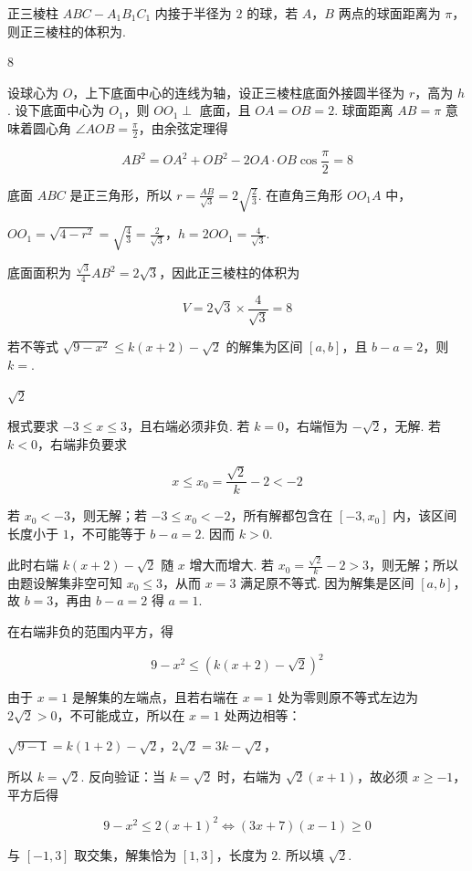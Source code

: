 \begin{problem}
正三棱柱 \(ABC - A_{1}B_{1}C_{1}\) 内接于半径为 \(2\) 的球，若 \(A\)，\(B\) 两点的球面距离为 \(\pi\)，则正三棱柱的体积为\fillinblank{}.
\end{problem}

\begin{answer}
\(8\)
\end{answer}

\begin{solution}
设球心为 \(O\)，上下底面中心的连线为轴，设正三棱柱底面外接圆半径为 \(r\)，高为 \(h\). 设下底面中心为 \(O_1\)，则 \(OO_1\perp\) 底面，且 \(OA=OB=2\). 球面距离 \(AB=\pi\) 意味着圆心角 \(\angle AOB=\frac\pi2\)，由余弦定理得

\[
AB^2=OA^2+OB^2-2OA\cdot OB\cos\frac\pi2=8
\]

底面 \(ABC\) 是正三角形，所以 \(r=\frac{AB}{\sqrt3}=2\sqrt{\frac23}\). 在直角三角形 \(OO_1A\) 中，

\(OO_1=\sqrt{4-r^2}=\sqrt{\frac43}=\frac2{\sqrt3}\)，\(h=2OO_1=\frac4{\sqrt3}\).

底面面积为 \(\frac{\sqrt3}{4}AB^2=2\sqrt3\)，因此正三棱柱的体积为

\[
V=2\sqrt3\times\frac4{\sqrt3}=8
\]
\end{solution}

\begin{problem}
若不等式 \(\sqrt{9 - x^2} \leqslant k(x + 2) - \sqrt{2}\) 的解集为区间 \([a, b]\)，且 \(b - a = 2\)，则 \(k = \)\fillinblank{}.
\end{problem}

\begin{answer}
\(\sqrt{2}\)
\end{answer}

\begin{solution}
根式要求 \(-3\leqslant x\leqslant3\)，且右端必须非负. 若 \(k=0\)，右端恒为 \(-\sqrt2\)，无解. 若 \(k<0\)，右端非负要求

\[
x\leqslant x_0=\frac{\sqrt2}{k}-2<-2
\]

若 \(x_0<-3\)，则无解；若 \(-3\leqslant x_0<-2\)，所有解都包含在 \([-3,x_0]\) 内，该区间长度小于 \(1\)，不可能等于 \(b-a=2\). 因而 \(k>0\).

此时右端 \(k(x+2)-\sqrt2\) 随 \(x\) 增大而增大. 若 \(x_0=\frac{\sqrt2}{k}-2>3\)，则无解；所以由题设解集非空可知 \(x_0\leqslant3\)，从而 \(x=3\) 满足原不等式. 因为解集是区间 \([a,b]\)，故 \(b=3\)，再由 \(b-a=2\) 得 \(a=1\).

在右端非负的范围内平方，得

\[
9-x^2\leqslant\left(k(x+2)-\sqrt2\right)^2
\]

由于 \(x=1\) 是解集的左端点，且若右端在 \(x=1\) 处为零则原不等式左边为 \(2\sqrt2>0\)，不可能成立，所以在 \(x=1\) 处两边相等：

\(\sqrt{9-1}=k(1+2)-\sqrt2\)，\(2\sqrt2=3k-\sqrt2\)，

所以 \(k=\sqrt2\). 反向验证：当 \(k=\sqrt2\) 时，右端为 \(\sqrt2(x+1)\)，故必须 \(x\geqslant-1\)，平方后得

\[
9-x^2\leqslant2(x+1)^2
\Longleftrightarrow (3x+7)(x-1)\geqslant0
\]

与 \([-1,3]\) 取交集，解集恰为 \([1,3]\)，长度为 \(2\). 所以填 \(\sqrt2\).
\end{solution}

